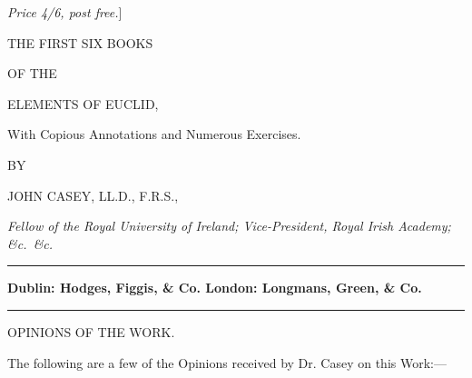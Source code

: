 \documentclass[oneside]{book}
\begin{document}

\newpage
\noindent
\textit{\textsf{Price 4/6, post free.}}]

\bigskip
\begin{center}
THE FIRST SIX BOOKS

\medskip
{\tiny OF THE}

\bigskip
\textsf{\LARGE ELEMENTS OF EUCLID,}

\medskip
With Copious Annotations and Numerous Exercises.
\bigskip

{\footnotesize BY}

\bigskip
{\Large JOHN CASEY, LL\@.D., F.R.S.,}

\medskip
\textit{\textsf{Fellow of the Royal University of Ireland; Vice-President, Royal
Irish Academy; \&c.\ \&c.}}

\bigskip
\rule[1ex]{3cm}{1pt}

\textbf{Dublin: Hodges, Figgis, \& Co.\quad
London: Longmans, Green, \& Co.}

\medskip
\rule[1ex]{3cm}{1pt}
\bigskip

\textsf{\Large OPINIONS OF THE WORK.}
\end{center}

The following are a few of the Opinions received by
Dr. Casey on this Work:---
\end{document}
